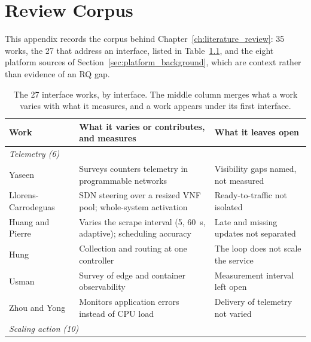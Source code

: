 ﻿\documentclass[12pt,reqno,twoside]{amsbook}
\begin{document}
{\chapter{Review Corpus}\label{app:review_matrix}
This appendix records the corpus behind Chapter~\ref{ch:literature_review}: 35
works, the 27 that address an interface, listed in
Table~\ref{tab:review_matrix}, and the eight platform sources of
Section~\ref{sec:platform_background}, which are context rather than evidence
of an RQ gap.

\begin{table}[H]
    \centering
    \caption{The 27 interface works, by interface. The middle column merges
    what a work varies with what it measures, and a work appears under its
    first interface.}
    \label{tab:review_matrix}
    \scriptsize
    \renewcommand{\arraystretch}{0.86}
    \setlength{\tabcolsep}{3pt}
    \begin{tabular}{p{} p{} p{}}
        \toprule
        Work & What it varies or contributes, and measures & What it leaves open \\
        \midrule
        \multicolumn{3}{l}{\textit{Telemetry (6)}} \\
        Yaseen~\parencite{Yaseen2025CountersTelemetrySurveyProgrammableNetwork} & Surveys counters telemetry in programmable networks & Visibility gaps named, not measured \\
        Llorens-Carrodeguas~\parencite{Llorens2021SDNBasedHorizontalAutoScalingLoadBalancing} & SDN steering over a resized VNF pool; whole-system activation & Ready-to-traffic not isolated \\
        Huang and Pierre~\parencite{Huang2023AdapPFSelfAdaptiveScrapeInterval} & Varies the scrape interval (5, 60~s, adaptive); scheduling accuracy & Late and missing updates not separated \\
        Hung~\parencite{Hung2022SDNControllerMonitoringArchitecture5G} & Collection and routing at one controller & The loop does not scale the service \\
        Usman~\parencite{Usman2022SurveyObservabilityDistributedEdgeAmp} & Survey of edge and container observability & Measurement interval left open \\
        Zhou and Yong~\parencite{Zhou2024ImplementHPANginxServiceUsing} & Monitors application errors instead of CPU load & Delivery of telemetry not varied \\
        \multicolumn{3}{l}{\textit{Scaling action (10)}} \\

\end{tabular}
\end{table}}
\end{document}
